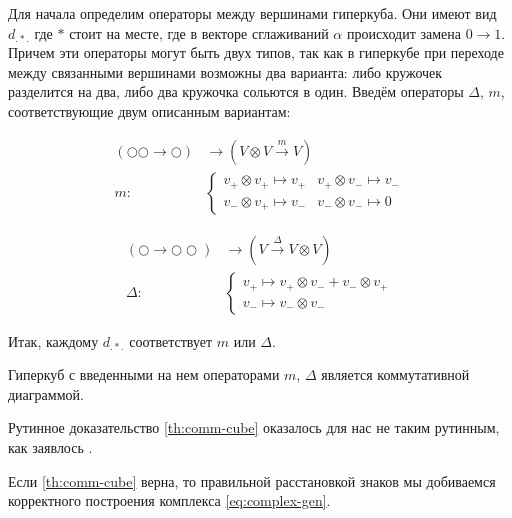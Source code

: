 \documentclass[a4paper,8pt]{extarticle}
\begin{document}
\begin{multicols}{2}
    Для начала определим операторы между вершинами гиперкуба.
    Они имеют вид $d_{. * .}$ где $*$ стоит на месте, где в векторе 
    сглаживаний $\alpha$ происходит замена $0 \rightarrow 1$. Причем
    эти операторы могут быть двух типов, так как
    в гиперкубе при переходе между связанными вершинами возможны два
    варианта: либо
    кружочек разделится на два, либо два кружочка сольются в один.
    Введём операторы $\Delta$, $m$, соответствующие двум описанным 
    вариантам:

    \begin{align}
    (\bigcirc \bigcirc \longrightarrow \bigcirc) &\longrightarrow (V \otimes V \overset{m}{\to} V) \nonumber \\
    m: &\begin{cases}
    v_+ \otimes v_+ \mapsto v_+ & v_+ \otimes v_- \mapsto v_- \\
    v_- \otimes v_+ \mapsto v_- & v_- \otimes v_- \mapsto 0
    \end{cases} \label{eq:m_complete}
    \end{align}

    \begin{align}
    (\bigcirc \longrightarrow \bigcirc \bigcirc) &\longrightarrow (V \overset{\Delta}{\to} V \otimes V) \nonumber \\
    \Delta: &\begin{cases}
    v_+ \mapsto v_+ \otimes v_- + v_- \otimes v_+ \\
    v_- \mapsto v_- \otimes v_-
    \end{cases} \label{eq:delta_complete}
    \end{align}

    Итак, каждому $d_{. * .}$ соответствует $m$ или $\Delta$.


    \begin{tcolorbox}
        \begin{theorem}
        Гиперкуб с введенными на нем операторами $m$, $\Delta$
        является коммутативной диаграммой.
        \label{th:comm-cube}
    \end{theorem}
    \end{tcolorbox}
    

    Рутинное доказательство \ref{th:comm-cube} оказалось для нас 
    не таким рутинным, как заявлось \parencite{bar-natan}.

    Если \ref{th:comm-cube} верна, то правильной расстановкой знаков
    мы добиваемся корректного построения комплекса \eqref{eq:complex-gen}.


\end{multicols}
\end{document}
